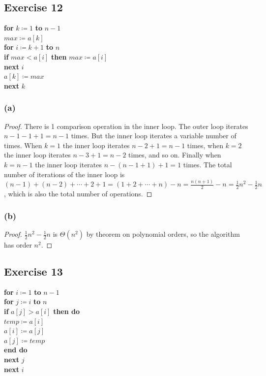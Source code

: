 \documentclass[14pt]{extarticle}
\begin{document}
\subsection{Exercise 12}
\begin{tabbing}
    {\bf for} \= \(k \coloneqq 1\) {\bf to} \(n-1\) \\
    \> \(max \coloneqq a[k]\) \\
    \> {\bf for} \= \(i \coloneqq k+1\) {\bf to} \(n\)\\
    \>           \> {\bf if} \(max < a[i]\) {\bf then} \(max \coloneqq a[i]\) \\
    \> {\bf next} \(i\) \\
    \(a[k] \coloneqq max\) \\
    {\bf next} \(k\)
\end{tabbing}

\subsubsection{(a)}
\begin{proof}
    There is 1 comparison operation in the inner loop. The outer loop iterates \(n-1-1+1 = n-1\) times. But the inner loop
    iterates a variable number of times. When \(k=1\) the inner loop iterates \(n-2+1 = n-1\) times, when \(k=2\) the inner
    loop iterates \(n-3+1 = n-2\) times, and so on. Finally when \(k=n-1\) the inner loop iterates \(n-(n-1+1)+1 = 1\) times.
    The total number of iterations of the inner loop is \((n-1) + (n-2) + \cdots + 2 + 1 = (1+2+ \cdots + n) - n =
    \frac{n(n+1)}{2} - n = \frac{1}{2}n^2 - \frac{1}{2}n\), which is also the total number of operations.
\end{proof}

\subsubsection{(b)}
\begin{proof}
    \(\frac{1}{2}n^2 - \frac{1}{2}n\) is \(\Theta(n^2)\) by theorem on polynomial orders, so the algorithm has order
    \(n^2\).
\end{proof}

\subsection{Exercise 13}
\begin{tabbing}
    {\bf for} \= \(i \coloneqq 1\) {\bf to} \(n-1\) \\
    \> {\bf for} \= \(j \coloneqq i\) {\bf to} \(n\)\\
    \>           \> {\bf if} \= \(a[j] > a[i]\) {\bf then do} \\
    \>           \>          \>\(temp \coloneqq a[i]\)\\
    \>           \>          \>\(a[i] \coloneqq a[j]\)\\
    \>           \>          \>\(a[j] \coloneqq temp\)\\
    \>           \> {\bf end do} \\
    \> {\bf next} \(j\) \\
    {\bf next} \(i\)
\end{tabbing}
\end{document}
